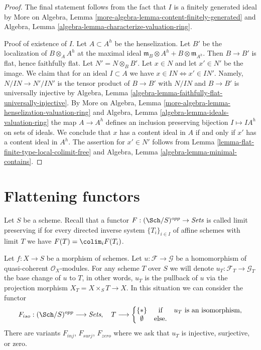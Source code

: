 \begin{proof}
The final statement follows from the fact that $I$ is a finitely
generated ideal by
More on Algebra, Lemma \ref{more-algebra-lemma-content-finitely-generated}
and Algebra, Lemma \ref{algebra-lemma-characterize-valuation-ring}.

\medskip\noindent
Proof of existence of $I$.
Let $A \subset A^h$ be the henselization. Let $B'$ be the localization
of $B \otimes_A A^h$ at the maximal ideal
$\mathfrak m_B \otimes A^h + B \otimes \mathfrak m_{A^h}$.
Then $B \to B'$ is flat, hence faithfully flat.
Let $N' = N \otimes_B B'$.
Let $x \in N$ and let $x' \in N'$ be the image.
We claim that for an ideal $I \subset A$ we have
$x \in IN \Leftrightarrow x' \in IN'$.
Namely, $N/IN \to N'/IN'$ is the tensor product of $B \to B'$
with $N/IN$ and $B \to B'$ is universally injective by
Algebra, Lemma \ref{algebra-lemma-faithfully-flat-universally-injective}.
By More on Algebra, Lemma \ref{more-algebra-lemma-henselization-valuation-ring}
and Algebra, Lemma \ref{algebra-lemma-ideals-valuation-ring}
the map $A \to A^h$ defines an inclusion preserving
bijection $I \mapsto IA^h$ on sets of ideals. We conclude that
$x$ has a content ideal in $A$ if and only if $x'$ has a content
ideal in $A^h$. The assertion for $x' \in N'$ follows from
Lemma \ref{lemma-flat-finite-type-local-colimit-free} and
Algebra, Lemma \ref{algebra-lemma-minimal-contains}.
\end{proof}





\section{Flattening functors}
\label{section-flattening-functors}

\noindent
Let $S$ be a scheme. Recall that a functor
$F : (\Sch/S)^{opp} \to \textit{Sets}$ is called limit preserving
if for every directed inverse system
$\{T_i\}_{i \in I}$ of affine schemes with limit $T$ we have
$F(T) = \colim_i F(T_i)$.

\begin{situation}
\label{situation-iso}
Let $f : X \to S$ be a morphism of schemes.
Let $u : \mathcal{F} \to \mathcal{G}$ be a homomorphism of
quasi-coherent $\mathcal{O}_X$-modules. For any scheme $T$ over
$S$ we will denote $u_T : \mathcal{F}_T \to \mathcal{G}_T$ the
base change of $u$ to $T$, in other words, $u_T$ is the pullback
of $u$ via the projection morphism $X_T = X \times_S T \to X$.
In this situation we can consider the functor
\begin{equation}
\label{equation-iso}
F_{iso} : (\Sch/S)^{opp} \longrightarrow \textit{Sets}, \quad
T \longrightarrow \left\{
\begin{matrix}
\{*\} & \text{if} & u_T \text{ is an isomorphism}, \\
\emptyset & \text{else.} &
\end{matrix}
\right.
\end{equation}
There are variants $F_{inj}$, $F_{surj}$, $F_{zero}$ where we ask that
$u_T$ is injective, surjective, or zero.
\end{situation}

